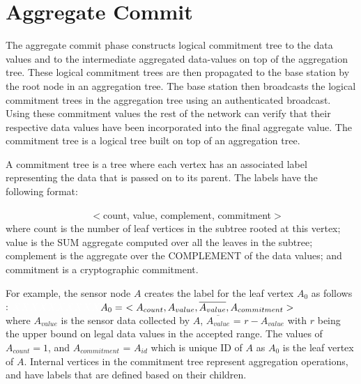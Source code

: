 \section{Aggregate Commit} 
	\label{sub:aggregate_commit}
	The aggregate commit phase constructs logical commitment tree to the data values and to the intermediate aggregated data-values on top of the aggregation tree.
	These logical commitment trees are then propagated to the base station by the root node in an aggregation tree.
	The base station then broadcasts the logical commitment trees in the aggregation tree using an authenticated broadcast.
	Using these commitment values the rest of the network can verify that their respective data values have been incorporated into the final aggregate value.
	The commitment tree is a logical tree built on top of an aggregation tree.
	\begin{definition}
		\cite{chan2006secure}
		A commitment tree is a tree where each vertex has an associated label representing the data that is passed on to its parent. The labels have the following format:

		$\hspace{100pt}$ $<$count, value, complement, commitment$>$\\
		where count is the number of leaf vertices in the subtree rooted at this vertex; value is the SUM aggregate computed over all the leaves in the subtree; complement is the aggregate over the COMPLEMENT of the data values; and commitment is a cryptographic commitment.
		\label{def:label}
	\end{definition}
	For example, the sensor node $A$ creates the label for the leaf vertex $A_{0}$ as follows :
		$\textcolor{white}{XXXXXXXXXX} A_{0} =\ <A_{count}, A_{value}, \overline{A_{value}}, A_{commitment}>$\\
	where $A_{value}$ is the sensor data collected by $A$, $\overline{A_{value}}$ = $r - A_{value}$ with $r$ being the upper bound on legal data values in the accepted range.
	The values of $A_{count} = 1$, and $A_{commitment}$ = $A_{id}$ which is unique ID of $A$ as $A_{0}$ is the leaf vertex of $A$.
	Internal vertices in the commitment tree represent aggregation operations, and have labels that are defined based on their children. 
